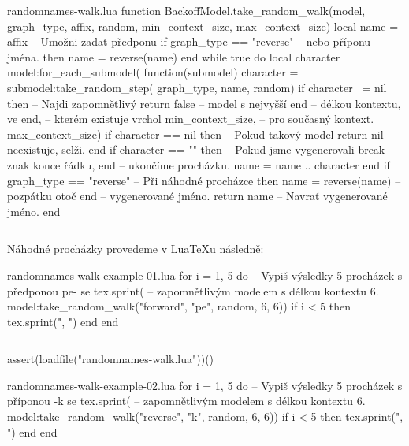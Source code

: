 \documentclass{csbulletin}
\let\exampleoutput\emph
\newcommand\myinputminted[3][]{%
  \inputminted[#1]{#2}{#3}%
}
\newcommand\myinputminted[3][]{%
  \inputminted[#1]{#2}{code-placeholder.#2}%
}
\begin{document}
\begin{filecontents}{randomnames-walk.lua}
function BackoffModel.take_random_walk(model, graph_type,
                                       affix, random,
                                       min_context_size,
                                       max_context_size)
  local name = affix              -- Umožni zadat předponu
  if graph_type == "reverse"      -- nebo příponu jména.
    then name = reverse(name)
  end
  while true do
    local character
    model:for_each_submodel(
      function(submodel)
        character = submodel:take_random_step(
          graph_type, name, random)
        if character ~= nil then  -- Najdi zapomnětlivý
          return false            -- model s nejvyšší
        end                       -- délkou kontextu, ve
      end,                        -- kterém existuje vrchol
      min_context_size,           -- pro současný kontext.
      max_context_size)
    if character == nil then      -- Pokud takový model
      return nil                  -- neexistuje, selži.
    end
    if character == "\n" then     -- Pokud jsme vygenerovali
      break                       -- znak konce řádku,
    end                           -- ukončíme procházku.
    name = name .. character
  end
  if graph_type == "reverse"      -- Při náhodné procházce
    then name = reverse(name)     -- pozpátku otoč
  end                             -- vygenerované jméno.
  return name                     -- Navrať vygenerované jméno.
end
\end{filecontents}
\myinputminted{lua}{randomnames-walk.lua}

Náhodné procházky provedeme v Lua\TeX u následně:

\begin{filecontents}{randomnames-walk-example-01.lua}
for i = 1, 5 do -- Vypiš výsledky 5 procházek s předponou pe- se
  tex.sprint(   -- zapomnětlivým modelem s délkou kontextu 6.
    model:take_random_walk("forward", "pe", random, 6, 6))
  if i < 5 then tex.sprint(", ") end
end
\end{filecontents}
\myinputminted[linenos=false]{lua}{randomnames-walk-example-01.lua}

\noindent
\begin{luacode*}
assert(loadfile("randomnames-walk.lua"))()
\end{luacode*}
\exampleoutput{}

\begin{filecontents}{randomnames-walk-example-02.lua}
for i = 1, 5 do -- Vypiš výsledky 5 procházek s příponou -k se
  tex.sprint(   -- zapomnětlivým modelem s délkou kontextu 6.
    model:take_random_walk("reverse", "k", random, 6, 6))
  if i < 5 then tex.sprint(", ") end
end
\end{filecontents}
\myinputminted[linenos=false]{lua}{randomnames-walk-example-02.lua}
\end{document}
